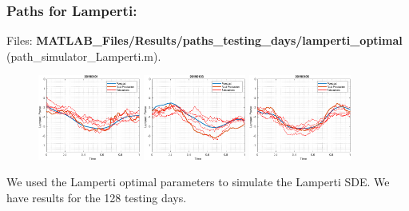 \documentclass[aspectratio=169]{beamer}\usepackage[utf8]{inputenc}
\begin{document}
\begin{frame}\frametitle{Paths for Lamperti:}
Files: \textbf{MATLAB\_Files/Results/paths\_testing\_days/lamperti\_optimal} (path\_simulator\_Lamperti.m).

\begin{figure}[ht!]
\centering
\includegraphics[width=0.3\textwidth]{../../MATLAB_Files/Results/paths_testing_days/lamperti_optimal/1.eps}
\includegraphics[width=0.3\textwidth]{../../MATLAB_Files/Results/paths_testing_days/lamperti_optimal/2.eps}
\includegraphics[width=0.3\textwidth]{../../MATLAB_Files/Results/paths_testing_days/lamperti_optimal/3.eps}
\end{figure}

We used the Lamperti optimal parameters to simulate the Lamperti SDE. We have results for the 128 testing days.

\end{frame}

\end{document}
